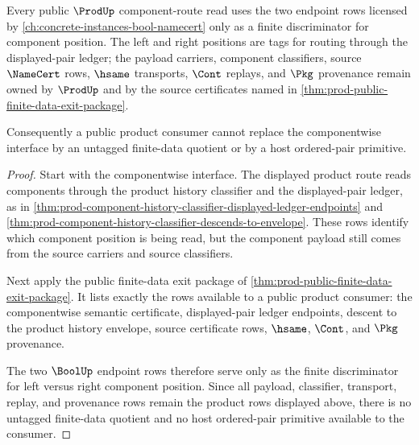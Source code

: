 \begin{theorem}
\label{thm:prod-bool-endpoint-discriminator-route}
Every public $\ProdUp$ component-route read uses the two endpoint rows licensed
by \autoref{ch:concrete-instances-bool-namecert} only as a finite discriminator
for component position. The left and right positions are tags for routing
through the displayed-pair ledger; the payload carriers, component classifiers,
source $\NameCert$ rows, $\hsame$ transports, $\Cont$ replays, and $\Pkg$
provenance remain owned by $\ProdUp$ and by the source certificates named in
\autoref{thm:prod-public-finite-data-exit-package}.

Consequently a public product consumer cannot replace the componentwise
interface by an untagged finite-data quotient or by a host ordered-pair
primitive.
\end{theorem}
\begin{proof}
Start with the componentwise interface. The displayed product route reads
components through the product history classifier and the displayed-pair ledger,
as in \autoref{thm:prod-component-history-classifier-displayed-ledger-endpoints}
and \autoref{thm:prod-component-history-classifier-descends-to-envelope}. These
rows identify which component position is being read, but the component payload
still comes from the source carriers and source classifiers.

Next apply the public finite-data exit package of
\autoref{thm:prod-public-finite-data-exit-package}. It lists exactly the rows
available to a public product consumer: the componentwise semantic certificate,
displayed-pair ledger endpoints, descent to the product history envelope, source
certificate rows, $\hsame$, $\Cont$, and $\Pkg$ provenance.

The two $\BoolUp$ endpoint rows therefore serve only as the finite discriminator
for left versus right component position. Since all payload, classifier,
transport, replay, and provenance rows remain the product rows displayed above,
there is no untagged finite-data quotient and no host ordered-pair primitive
available to the consumer.
\end{proof}

